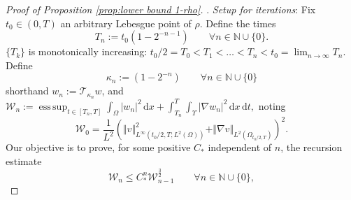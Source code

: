 \documentclass[11pt,a4paper,reqno]{amsart}
\theoremstyle{remark}
\theoremstyle{definition}
\numberwithin{equation}{section}
\DeclareMathOperator{\esssup}{ess \, sup}
\renewcommand{\d}{\, \mathrm{d} }
\begin{document}
\begin{proof}[Proof of Proposition \ref{prop:lower bound 1-rho}]
    \smallskip 

    . \textit{Setup for iterations}: Fix $t_0 \in (0,T)$ an arbitrary Lebesgue point of $\rho$. Define the times \begin{equation}\label{eq:Tn def}
    T_n := t_0(1- 2^{-n-1}) \qquad \forall n \in \mathbb{N}\cup\{0\}.
    \end{equation}
    $\{T_k\}$ is monotonically increasing: $t_0/2 = T_0 < T_1 < \dots < T_n < t_0 = \lim_{n \to \infty} T_n$. Define 
    \begin{equation}\label{eq:kappa n def} 
    \kappa_n := (1-2^{-n})  \qquad \forall n \in \mathbb{N}\cup\{0\}
    \end{equation}
    shorthand $w_n := \mathscr{T}_{\kappa_n} w$, and $\mathscr{W}_n := \esssup_{t \in [T_n,T]} \int_\Omega |w_n|^2 \d x + \int_{T_n}^T \int_\Upsilon |\nabla w_n|^2 \d x \d t,$ noting 
\begin{equation}\label{eq:W0 def}
\mathscr{W}_0 = \frac{1}{L^{2}}(\Vert v \Vert_{L^\infty(t_0/2,T;L^2(\Omega))}^2 + \Vert \nabla v \Vert_{L^2(\Omega_{t_0/2,T})})^2. 
\end{equation}
Our objective is to prove, for some positive $C_*$ independent of $n$, the recursion estimate 
\begin{equation}\label{eq:recursion estimate moser for w}
    \mathscr{W}_{n} \leq C_*^n \mathscr{W}_{n-1}^{\frac{3}{2}} \qquad \forall n \in \mathbb{N} \cup \{0\}, 
\end{equation}
 


\end{proof}
\end{document}
